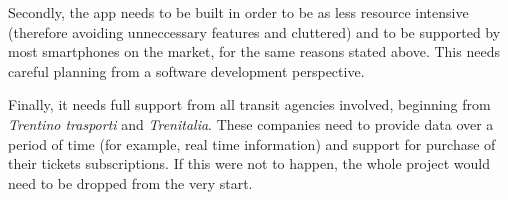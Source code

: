 \documentclass[11pt]{article}
\begin{document}
Secondly, the app needs to be built in order to be as less resource intensive (therefore avoiding unneccessary features and cluttered) and to be supported by most smartphones on the market, for the same reasons stated above. This needs careful planning from a software development perspective.

Finally, it needs full support from all transit agencies involved, beginning from \textit{Trentino trasporti} and \textit{Trenitalia}. These companies need to provide data over a period of time (for example, real time information) and support for purchase of their tickets subscriptions. If this were not to happen, the whole project would need to be dropped from the very start.
\end{document}
